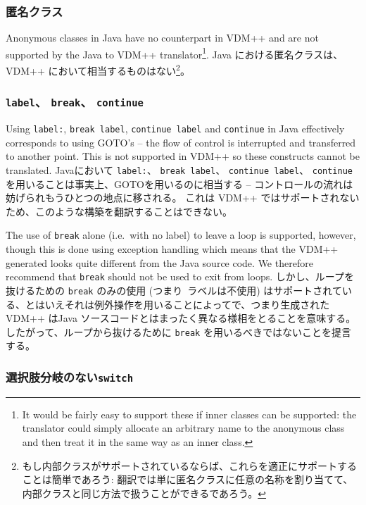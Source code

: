 \documentclass[\pformat,12pt]{jarticle}
\begin{document}
\subsubsection{匿名クラス}

Anonymous classes in Java have no counterpart in VDM++ and are not
supported by the Java to VDM++ translator\footnote{It would be fairly
  easy to support these if inner classes can be supported: the translator
  could simply allocate an arbitrary name to the anonymous class and
  then treat it in the same way as an inner class.}. 
 Java における匿名クラスは、 VDM++ において相当するものはない\footnote{もし内部クラスがサポートされているならば、これらを適正にサポートすることは簡単であろう: 翻訳では単に匿名クラスに任意の名称を割り当てて、内部クラスと同じ方法で扱うことができるであろう。}。

\subsubsection{\texttt{label}、 \texttt{break}、 \texttt{continue}}

Using \texttt{label:}, \texttt{break label}, \texttt{continue
  label} and \texttt{continue} in Java effectively corresponds to
  using GOTO's -- the flow of control is interrupted and transferred
  to another point. This is not supported in VDM++ so these constructs
  cannot be translated.
Javaにおいて \texttt{label:}、 \texttt{break label}、 \texttt{continue label}、 \texttt{continue} を用いることは事実上、GOTOを用いるのに相当する -- コントロールの流れは妨げられもうひとつの地点に移される。
これは VDM++ ではサポートされないため、このような構築を翻訳することはできない。

The use of \texttt{break} alone (i.e.\ with no label) to leave a loop
is supported, however, though this is done using exception handling
which means that the VDM++ generated looks quite different from the
Java source code. We therefore recommend that \texttt{break} should
not be used to exit from loops.
しかし、ループを抜けるための \texttt{break} のみの使用 (つまり\ ラベルは不使用) はサポートされている、とはいえそれは例外操作を用いることによってで、つまり生成された VDM++ はJava ソースコードとはまったく異なる様相をとることを意味する。したがって、ループから抜けるために \texttt{break} を用いるべきではないことを提言する。

\subsubsection{選択肢分岐のない\texttt{switch}}
\end{document}
